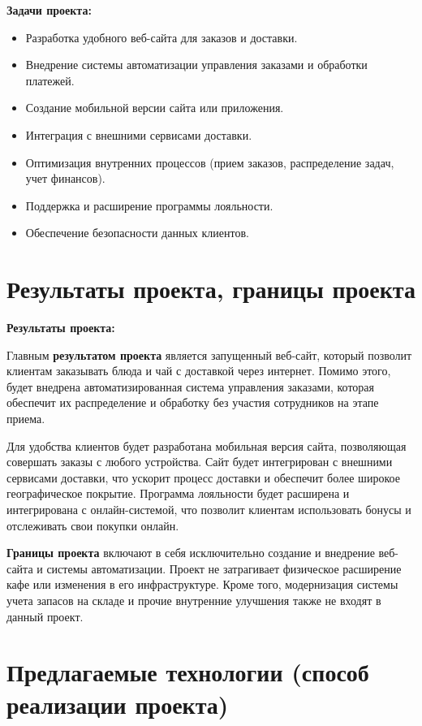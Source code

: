 \textbf{Задачи проекта:}

\begin{itemize}
	\item Разработка удобного веб-сайта для заказов и доставки.
	\item Внедрение системы автоматизации управления заказами
		и обработки платежей.
	\item Создание мобильной версии сайта или приложения.
	\item Интеграция с внешними сервисами доставки.
	\item Оптимизация внутренних процессов
		(прием заказов, распределение задач, учет финансов).
	\item Поддержка и расширение программы лояльности.
	\item Обеспечение безопасности данных клиентов.
\end{itemize}

\section{Результаты проекта, границы проекта}

\textbf{Результаты проекта:}

Главным \textbf{результатом проекта} является запущенный веб-сайт,
который позволит клиентам заказывать блюда и чай с доставкой через интернет.
Помимо этого, будет внедрена автоматизированная система управления заказами,
которая обеспечит их распределение
и обработку без участия сотрудников на этапе приема.

Для удобства клиентов будет разработана мобильная версия сайта,
позволяющая совершать заказы с любого устройства.
Сайт будет интегрирован с внешними сервисами доставки,
что ускорит процесс доставки и обеспечит более широкое географическое покрытие.
Программа лояльности будет расширена и интегрирована с онлайн-системой,
что позволит клиентам использовать бонусы и отслеживать свои покупки онлайн.

\textbf{Границы проекта} включают в себя исключительно создание
и внедрение веб-сайта и системы автоматизации.
Проект не затрагивает физическое расширение кафе
или изменения в его инфраструктуре.
Кроме того, модернизация системы учета запасов на складе
и прочие внутренние улучшения также не входят в данный проект.

\section{Предлагаемые технологии (способ реализации проекта)}


